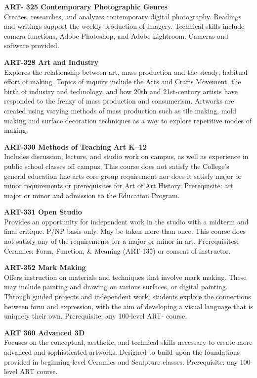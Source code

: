\documentclass[
  letterpaper,
]{scrbook}
\begin{document}
\textbf{ART- 325 Contemporary Photographic Genres}\\
Creates, researches, and analyzes contemporary digital photography.
Readings and writings support the weekly production of imagery.
Technical skills include camera functions, Adobe Photoshop, and Adobe
Lightroom. Cameras and software provided.

\textbf{ART-328 Art and Industry}\\
Explores the relationship between art, mass production and the steady,
habitual effort of making. Topics of inquiry include the Arts and Crafts
Movement, the birth of industry and technology, and how 20th and
21st-century artists have responded to the frenzy of mass production and
consumerism. Artworks are created using varying methods of mass
production such as tile making, mold making and surface decoration
techniques as a way to explore repetitive modes of making.

\textbf{ART-330 Methods of Teaching Art K--12}\\
Includes discussion, lecture, and studio work on campus, as well as
experience in public school classes off campus. This course does not
satisfy the College's general education fine arts core group requirement
nor does it satisfy major or minor requirements or prerequisites for Art
of Art History. Prerequisite: art major or minor and admission to the
Education Program.

\textbf{ART-331 Open Studio}\\
Provides an opportunity for independent work in the studio with a
midterm and final critique. P/NP basis only. May be taken more than
once. This course does not satisfy any of the requirements for a major
or minor in art. Prerequisites: Ceramics: Form, Function, \& Meaning
(ART-135) or consent of instructor.

\textbf{ART-352 Mark Making}\\
Offers instruction on materials and techniques that involve mark making.
These may include painting and drawing on various surfaces, or digital
painting. Through guided projects and independent work, students explore
the connections between form and expression, with the aim of developing
a visual language that is uniquely their own. Prerequisite: any
100-level ART- course.

\textbf{ART 360 Advanced 3D}\\
Focuses on the conceptual, aesthetic, and technical skills necessary to
create more advanced and sophisticated artworks. Designed to build upon
the foundations provided in beginning-level Ceramics and Sculpture
classes. Prerequisite: any 100-level ART course.
\end{document}

